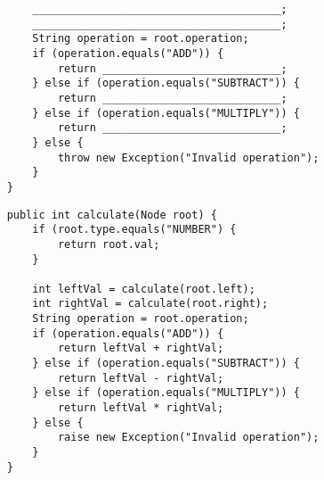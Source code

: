 \begin{parts}
\begin{lstlisting}
        _______________________________________;
        _______________________________________;
        String operation = root.operation;
        if (operation.equals("ADD")) {
            return ____________________________;
        } else if (operation.equals("SUBTRACT")) {
            return ____________________________;
        } else if (operation.equals("MULTIPLY")) {
            return ____________________________;
        } else {
            throw new Exception("Invalid operation");
        }
    }
    \end{lstlisting}

    \begin{solution}
    \begin{lstlisting}
    public int calculate(Node root) {
        if (root.type.equals("NUMBER") {
            return root.val;
        }
        
        int leftVal = calculate(root.left);
        int rightVal = calculate(root.right);
        String operation = root.operation;
        if (operation.equals("ADD")) {
            return leftVal + rightVal;
        } else if (operation.equals("SUBTRACT")) {
            return leftVal - rightVal;
        } else if (operation.equals("MULTIPLY")) {
            return leftVal * rightVal;
        } else {
            raise new Exception("Invalid operation");
        }
    }
    \end{lstlisting}
    \end{solution}
\end{parts}
